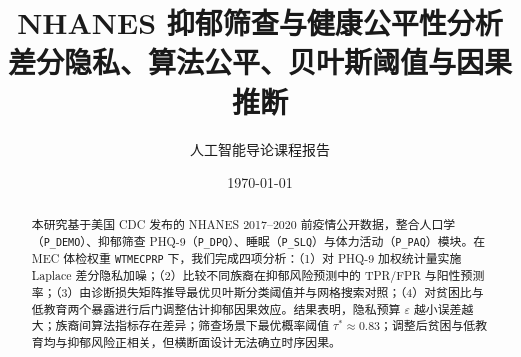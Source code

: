 \title{NHANES 抑郁筛查与健康公平性分析\\{\large 差分隐私、算法公平、贝叶斯阈值与因果推断}}
\author{人工智能导论课程报告}
\date{\today}
\maketitle

\begin{abstract}
本研究基于美国 CDC 发布的 NHANES 2017--2020 前疫情公开数据，整合人口学（\texttt{P\_DEMO}）、抑郁筛查 PHQ-9（\texttt{P\_DPQ}）、睡眠（\texttt{P\_SLQ}）与体力活动（\texttt{P\_PAQ}）模块。在 MEC 体检权重 \texttt{WTMECPRP} 下，我们完成四项分析：（1）对 PHQ-9 加权统计量实施 Laplace 差分隐私加噪；（2）比较不同族裔在抑郁风险预测中的 TPR/FPR 与阳性预测率；（3）由诊断损失矩阵推导最优贝叶斯分类阈值并与网格搜索对照；（4）对贫困比与低教育两个暴露进行后门调整估计抑郁因果效应。结果表明，隐私预算 $\varepsilon$ 越小误差越大；族裔间算法指标存在差异；筛查场景下最优概率阈值 $\tau^\ast \approx 0.83$；调整后贫困与低教育均与抑郁风险正相关，但横断面设计无法确立时序因果。
\end{abstract}

\tableofcontents
\newpage
